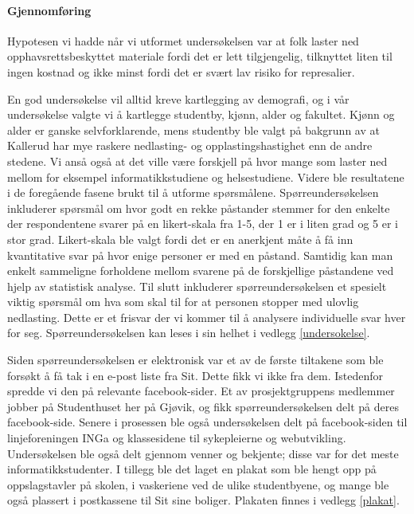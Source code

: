 \paragraph{Gjennomføring}
Hypotesen vi hadde når vi utformet undersøkelsen var at folk laster ned opphavsrettsbeskyttet materiale fordi det er lett tilgjengelig, tilknyttet liten til ingen kostnad og ikke minst fordi det er svært lav risiko for represalier.

En god undersøkelse vil alltid kreve kartlegging av demografi, og i vår undersøkelse valgte vi å kartlegge studentby, kjønn, alder og fakultet. Kjønn og alder er ganske selvforklarende, mens studentby ble valgt på bakgrunn av at Kallerud har mye raskere nedlasting- og opplastingshastighet enn de andre stedene. Vi anså også at det ville være forskjell på hvor mange som laster ned mellom for eksempel informatikkstudiene og helsestudiene. Videre ble resultatene i de foregående fasene brukt til å utforme spørsmålene. Spørreundersøkelsen inkluderer spørsmål om hvor godt en rekke påstander stemmer for den enkelte der respondentene svarer på en likert-skala fra 1-5, der 1 er i liten grad og 5 er i stor grad. Likert-skala ble valgt fordi det er en anerkjent måte å få inn kvantitative svar på hvor enige personer er med en påstand. Samtidig kan man enkelt sammeligne forholdene mellom svarene på de forskjellige påstandene ved hjelp av statistisk analyse. Til slutt inkluderer spørreundersøkelsen et spesielt viktig spørsmål om hva som skal til for at personen stopper med ulovlig nedlasting. Dette er et frisvar der vi kommer til å analysere individuelle svar hver for seg. Spørreundersøkelsen kan leses i sin helhet i vedlegg \ref{undersokelse}.
\newline

Siden spørreundersøkelsen er elektronisk var et av de første tiltakene som ble forsøkt å få tak i en e-post liste fra Sit. Dette fikk vi ikke fra dem. Istedenfor spredde vi den på relevante facebook-sider. Et av prosjektgruppens medlemmer jobber på Studenthuset her på Gjøvik, og fikk spørreundersøkelsen delt på deres facebook-side. Senere i prosessen ble også undersøkelsen delt på facebook-siden til linjeforeningen INGa og klassesidene til sykepleierne og webutvikling. Undersøkelsen ble også delt gjennom venner og bekjente; disse var for det meste informatikkstudenter. I tillegg ble det laget en plakat som ble hengt opp på oppslagstavler på skolen, i vaskeriene ved de ulike studentbyene, og mange ble også plassert i postkassene til Sit sine boliger. Plakaten finnes i vedlegg \ref{plakat}.


